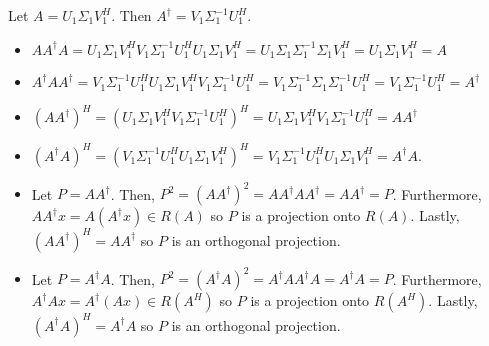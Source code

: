 \documentclass[12pt]{article}
\newenvironment{problem}[2][Problem]{\begin{trivlist}
\item[\hskip \labelsep {\bfseries #1}\hskip \labelsep {\bfseries #2}]}{\end{trivlist}}
\begin{document}
\begin{problem}{38.} Let $A = U_1\Sigma_1V_1^H$. Then $A^{\dagger} = V_1\Sigma_1^{-1}U^H_1$. 
\begin{itemize}
\item [(i)] $AA^{\dagger}A = U_1\Sigma_1V_1^{H}V_1\Sigma_1^{-1}U^H_1U_1\Sigma_1V_1^{H} = U_1\Sigma_1\Sigma_1^{-1}\Sigma_1V_1^{H}  = U_1\Sigma_1V_1^{H} = A$
\item [(ii)] $A^{\dagger}AA^{\dagger} = V_1\Sigma_1^{-1}U^H_1U_1\Sigma_1V_1^{H}V_1\Sigma_1^{-1}U^H_1 = 
V_1\Sigma_1^{-1}\Sigma_1\Sigma_1^{-1}U^H_1 = V_1\Sigma_1^{-1}U^H_1 = A^{\dagger}$
\item [(iii)] $(AA^{\dagger})^H = (U_1\Sigma_1V_1^HV_1\Sigma_1^{-1}U^H_1)^{H} = U_1\Sigma_1V_1^HV_1\Sigma_1^{-1}U^H_1 = AA^{\dagger}$
\item [(iv)] $(A^{\dagger}A)^H = (V_1\Sigma_1^{-1}U^H_1U_1\Sigma_1V_1^H)^H = V_1\Sigma_1^{-1}U^H_1U_1\Sigma_1V_1^H = A^{\dagger}A$. 
\item [(v)] Let $P =AA^{\dagger}$. Then, $P^2 = (AA^{\dagger})^2 = AA^{\dagger}AA^{\dagger} = AA^{\dagger} = P$. Furthermore, $AA^{\dagger}x = A(A^{\dagger}x) \in R(A)$ so $P$ is a projection onto $R(A)$. Lastly, $(AA^{\dagger})^H = AA^{\dagger}$ so $P$ is an orthogonal projection. 
\item [(vi)] Let $P =A^{\dagger}A$. Then, $P^2 = (A^{\dagger}A)^2 = A^{\dagger}AA^{\dagger}A = A^{\dagger}A = P$. Furthermore, $A^{\dagger}Ax = A^{\dagger}(Ax) \in R(A^H)$ so $P$ is a projection onto $R(A^H)$. Lastly, $(A^{\dagger}A)^H = A^{\dagger}A$ so $P$ is an orthogonal projection. 
\end{itemize}
\end{problem}
\end{document}
